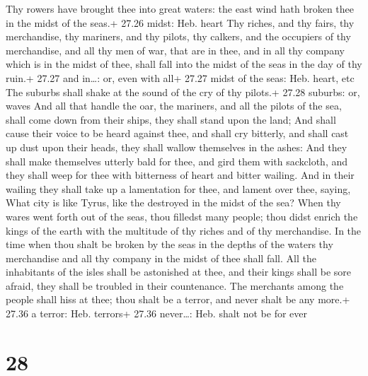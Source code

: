  Thy rowers have brought thee into great waters: the east
wind hath broken thee in the midst of the seas.+ 27.26 midst: Heb. heart
 Thy riches, and thy fairs, thy merchandise, thy mariners,
and thy pilots, thy calkers, and the occupiers of thy merchandise, and
all thy men of war, that are in thee, and in all thy company which is in
the midst of thee, shall fall into the midst of the seas in the day of
thy ruin.+ 27.27 and in\ldots: or, even with all+ 27.27 midst of the
seas: Heb. heart, etc  The suburbs shall shake at the sound
of the cry of thy pilots.+ 27.28 suburbs: or, waves  And
all that handle the oar, the mariners, and all the pilots of the sea,
shall come down from their ships, they shall stand upon the land;
 And shall cause their voice to be heard against thee, and
shall cry bitterly, and shall cast up dust upon their heads, they shall
wallow themselves in the ashes:  And they shall make
themselves utterly bald for thee, and gird them with sackcloth, and they
shall weep for thee with bitterness of heart and bitter wailing.
 And in their wailing they shall take up a lamentation for
thee, and lament over thee, saying, What city is like Tyrus, like the
destroyed in the midst of the sea?  When thy wares went
forth out of the seas, thou filledst many people; thou didst enrich the
kings of the earth with the multitude of thy riches and of thy
merchandise.  In the time when thou shalt be broken by the
seas in the depths of the waters thy merchandise and all thy company in
the midst of thee shall fall.  All the inhabitants of the
isles shall be astonished at thee, and their kings shall be sore afraid,
they shall be troubled in their countenance.  The merchants
among the people shall hiss at thee; thou shalt be a terror, and never
shalt be any more.+ 27.36 a terror: Heb. terrors+ 27.36 never\ldots:
Heb. shalt not be for ever

\hypertarget{section-27}{%
\section{28}\label{section-27}}

